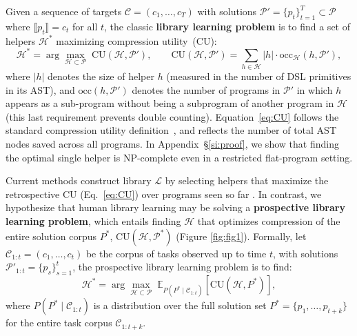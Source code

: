 \documentclass{article}
\begin{document}
Given a sequence of targets $\mathcal{C} = (c_1, \ldots, c_T)$ with solutions $\mathcal{P}' = \{p_t\}_{t=1}^{T} \subset \mathcal{P}$ where $\llbracket p_t \rrbracket = c_t$ for all $t$, the classic \textbf{library learning problem} is to find a set of helpers $\mathcal{H}^*$ maximizing compression utility~(CU):
\begin{equation}
\mathcal{H}^* = \arg\max_{\mathcal{H} \subset \mathcal{P}} \; 
    \mathrm{CU}(\mathcal{H}, \mathcal{P}'),
\qquad
        \mathrm{CU}(\mathcal{H}, \mathcal{P'}) = 
        \sum_{h \in \mathcal{H}} |h| \cdot \mathrm{occ}_\mathcal{H}(h, \mathcal{P'}),
        \label{eq:CU}
\end{equation}
where $|h|$ denotes the size of helper $h$ (measured in the number of DSL 
primitives in its AST), and $\mathrm{occ}(h, \mathcal{P'})$ denotes the 
number of programs in $\mathcal{P'}$ in which $h$ appears as a sub-program without being a subprogram of another program in $\mathcal{H}$ (this last requirement prevents double counting). Equation~\ref{eq:CU} follows the standard compression utility definition~\citep{bowers2023top, ellis2023dreamcoder}, and reflects the number of total AST nodes saved across all programs. 
In Appendix~\S\ref{si:proof}, we show that finding the optimal single helper is NP-complete even in a restricted flat-program setting.  

Current methods  construct library $\mathcal{L}$  by selecting helpers that maximize the retrospective CU (Eq.~\ref{eq:CU}) over programs seen so far \citep{ellis2023dreamcoder,bowers2023top}. 
In contrast, we hypothesize that human library learning may be solving a \textbf{prospective library learning problem}, which entails %
finding $\mathcal{H}$ that optimizes compression of the entire solution corpus $P^*$, $\mathrm{CU}(\mathcal{H}, \mathcal{P^*})$ (Figure \ref{fig:fig1}). 
Formally, let $\mathcal{C}_{1:t} = (c_1, \ldots, c_t)$ be the corpus of tasks observed 
up to time $t$, with solutions $\mathcal{P}'_{1:t} = \{p_s\}_{s=1}^{t}$,
the prospective library learning problem is to find:
\begin{equation}
    \mathcal{H}^* = \arg\max_{\mathcal{H} \subset \mathcal{P}} \; 
    \mathbb{E}_{P(P^* \mid \mathcal{C}_{1:t})} 
    \left[ \mathrm{CU}(\mathcal{H}, P^*) \right],
    \label{eq:prospective}
\end{equation}
where $P( P^*  \mid \mathcal{C}_{1:t})$ is a distribution over the full solution set $P^* = \{p_1, \ldots, p_{t+k}\}$ for the entire task corpus $\mathcal{C}_{1:t+k}$. 
\end{document}
